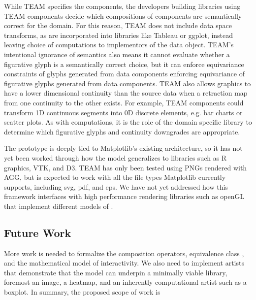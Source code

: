 \documentclass[../main.tex]{subfiles}
\begin{document}
While TEAM specifies the components, the developers building libraries using TEAM components decide which compositions of components are semantically correct for the domain. For this reason, TEAM does not include data space transforms, as are incorporated into libraries like Tableau or ggplot, instead leaving choice of computations to implementors of the data object. TEAM's intentional ignorance of semantics also means it cannot evaluate whether a figurative glyph \cite{byrneAcquiredCodesMeaning2016} is a semantically correct choice, but it can enforce equivariance constraints of glyphs generated from data components enforcing equivariance of figurative glyphs \cite{byrneAcquiredCodesMeaning2016} generated from data components\cite{beckfeathers2014,byrneFigurativeFramesCritical2017}. TEAM also allows graphics to have a lower dimensional continuity than the source data when a retraction map from one continuity to the other exists. For example, TEAM components could transform 1D continuous segments into 0D discrete elements, e.g. bar charts or scatter plots. As with computations, it is the role of the domain specific library to determine which figurative glyphs and continuity downgrades are appropriate. 

The prototype is deeply tied to Matplotlib's existing architecture, so it has not yet been worked through how the model generalizes to libraries such as R graphics\cite{murrellGraphicsThirdEdition2018}, VTK, and D3. TEAM has only been tested using PNGs rendered with AGG\cite{shemanarevAntiGrainGeometry}, but is expected to work with all the file types Matplotlib currently supports, including svg, pdf, and eps. We have not yet addressed how this framework interfaces with high performance rendering libraries such as openGL\cite{CarsonOpenGL1997} that implement different models of \gsection. 

\subsection{Future Work}
More work is needed to formalize the composition operators, equivalence class \vartisteq, and the mathematical model of interactivity. We also need to implement artists that demonstrate that the model can underpin a minimally viable library, foremost an image\cite{haber1990visualization,hansen2011visualization}, a heatmap\cite{wilkinsonHistoryClusterHeat2009,loua1873atlas}, and an inherently computational artist such as a boxplot\cite{wickham40YearsBoxplots2011}. In summary, the proposed scope of work is
\end{document}
